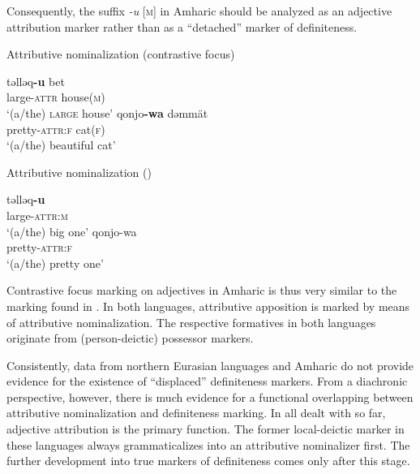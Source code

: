 {Consequently, the suffix \textit{-u} [\textsc{m}] in Amharic should be analyzed as an adjective attribution marker rather than as a “detached” marker of definiteness. 
\begin{exe}
\ex	{}
\begin{xlist}
\ex	\rm{Attributive nominalization (contrastive focus)}
\begin{xlist}
\ex
\gll	təlləq\textbf{-u} bet\\
	large-\textsc{attr} house(\textsc{m})\\
\glt	‘(a/the) \textsc{large} house’
\ex	
\gll	qonjo\textbf{-wa} dəmmät\\
	pretty-\textsc{attr:f} cat(\textsc{f})\\
\glt	‘(a/the) beautiful cat’
\end{xlist}
\ex	\rm{Attributive nominalization ()}
\begin{xlist}
\ex
\gll	təlləq\textbf{-u}\\
	large-\textsc{attr:m}\\
\glt	‘(a/the) big one’
\ex	
\gll	qonjo-wa\\
	pretty-\textsc{attr:f}\\
\glt	‘(a/the) pretty one’
\end{xlist}
\end{xlist}
\end{exe}
Contrastive focus marking on adjectives in Amharic is thus very similar to the marking found in . In both languages, attributive apposition is marked by means of attributive nominalization. The respective formatives in both languages originate from (person-deictic) possessor markers.

Consistently, data from northern Eurasian languages and Amharic do not provide evidence for the existence of “displaced” definiteness markers. From a diachronic perspective, however, there is much evidence for a functional overlapping between attributive nominalization and definiteness marking. In all  dealt with so far, adjective attribution is the primary function. The former local-deictic marker in these languages always grammaticalizes into an attributive nominalizer first. The further development into true markers of definiteness comes only after this stage.

}
